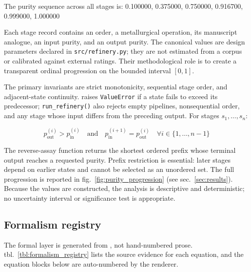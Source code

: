 \documentclass[
  english,
]{article}
\begin{document}
The purity sequence across all stages is: 0.100000, 0.375000, 0.750000,
0.916700, 0.999000, 1.000000

Each stage record contains an order, a metallurgical operation, its
manuscript analogue, an input purity, and an output purity. The
canonical values are design parameters declared in
\texttt{src/refinery.py}; they are not estimated from a corpus or
calibrated against external ratings. Their methodological role is to
create a transparent ordinal progression on the bounded interval
\([0,1]\).

The primary invariants are strict monotonicity, sequential stage order,
and adjacent-state continuity. 
raises \texttt{ValueError} if a state fails to exceed its predecessor;
\texttt{run\_refinery()} also rejects empty pipelines, nonsequential
order, and any stage whose input differs from the preceding output. For
stages \(s_1, \ldots, s_n\):

\[
p_{\text{out}}^{(i)} > p_{\text{in}}^{(i)} \quad \text{and} \quad p_{\text{in}}^{(i+1)} = p_{\text{out}}^{(i)} \quad \forall i \in \{1, \ldots, n-1\}
\]

The reverse-assay function  returns the
shortest ordered prefix whose terminal output reaches a requested
purity. Prefix restriction is essential: later stages depend on earlier
states and cannot be selected as an unordered set. The full progression
is reported in fig.~\ref{fig:purity_progression} (see
sec.~\ref{sec:results}). Because the values are constructed, the
analysis is descriptive and deterministic; no uncertainty interval or
significance test is appropriate.

\subsection{Formalism registry}\label{formalism-registry}

The formal layer is generated from , not
hand-numbered prose. tbl.~\ref{tbl:formalism_registry} lists the source
evidence for each equation, and the equation blocks below are
auto-numbered by the renderer.
\end{document}
